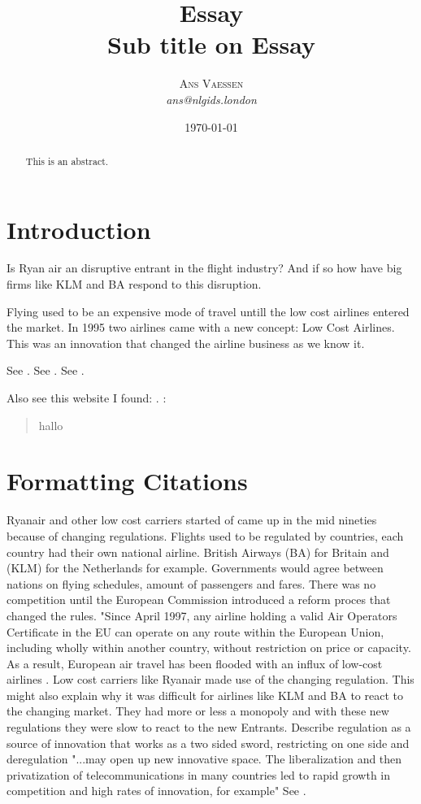 \documentclass[a4paper, 11pt]{article}
\title{\textbf{Essay}\\Sub title on Essay}
\author{\textsc{Ans Vaessen}
\\{\textit{ans@nlgids.london}}}
\date{\today}
\begin{document}
 
\maketitle 

\begin{abstract}
This is an abstract.
\end{abstract}

\vspace{30pt} %

\section*{Introduction}
Is Ryan air an disruptive entrant in the flight industry? And if so how have big firms like KLM and BA respond to this disruption.


Flying used to be an expensive mode of travel untill the low cost airlines entered the market. In 1995 two airlines came with a new concept: Low Cost Airlines. This was an innovation that changed the airline business as we know it. 




See \cite{Christensen97}.
See \citep{Christensen97}.
See \citep[p. 145]{Christensen97}.

Also see this website I found: \cite{TripAdvisor}.
:
\begin{quote}
hallo
\end{quote}

\section{Formatting Citations}

Ryanair and other low cost carriers started of came up in the mid nineties because of changing regulations. 
Flights used to be regulated by countries, each country had their own national airline. British Airways (BA) for Britain and (KLM) for the Netherlands for example. Governments would agree between nations on flying schedules, amount of passengers and fares. There was no competition until the European Commission introduced a reform proces that changed the rules. "Since April 1997, any airline holding a valid Air Operators Certificate in the EU can operate on any route within the European Union, including wholly within another country, without restriction on price or capacity. As a result, European air travel has been flooded with an influx of low-cost airlines \citep{Eurocontrol}. Low cost carriers like Ryanair made use of the changing regulation. This might also explain why it was difficult for airlines like KLM and BA to react to the changing market. They had more or less a monopoly and with these new regulations they were slow to react to the new Entrants. \citep{TiddBessant} Describe regulation as a source of innovation that works as a two sided sword, restricting on one side and deregulation "...may open up new innovative space. The liberalization and then privatization of telecommunications in many countries led to rapid growth in competition and high rates of innovation, for example" See \citep[p. 219]{TiddBessant}. 
\end{document}
